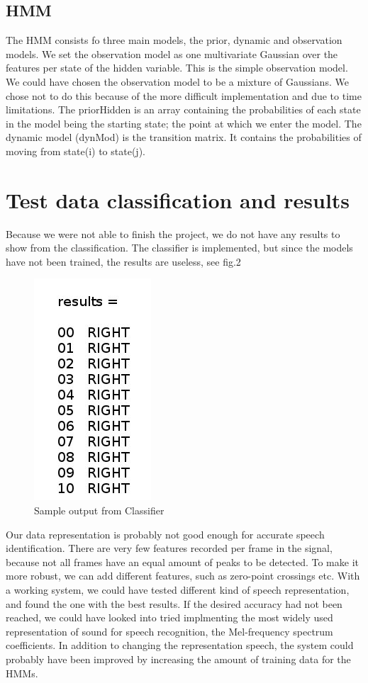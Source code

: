 \documentclass[titlepage]{article}
\begin{document}
    \subsection{HMM}
The HMM consists fo three main models, the prior, dynamic and observation models.  
We set the observation model as one multivariate Gaussian over the features per state of the hidden variable. This is the simple observation model. We could have chosen the observation model to be a mixture of Gaussians. We chose not to do this because of the more difficult implementation and due to time limitations. 
The priorHidden is an array containing the probabilities of each state in the model being the starting state; the point at which we enter the model.
The dynamic model (dynMod) is the transition matrix. It contains the probabilities of moving from state(i) to state(j).

\section{Test data classification and results}
        Because we were not able to finish the project, we do not have any results to show from the classification. The classifier is implemented, but since the models have not been trained, the results are useless, see fig.2
\begin{figure}[Frames plotted]
\center
     \includegraphics[scale = 0.5]{result}
    \caption{Sample output from Classifier}
\end{figure}
Our data representation is probably not good enough for accurate speech identification. There are very few features recorded per frame in the signal, because not all frames have an equal amount of peaks to be detected. To make it more robust, we can add different features, such as zero-point crossings etc. With a working system, we could have tested different kind of speech representation, and found the one with the best results. If the desired accuracy had not been reached, we could have looked into tried implmenting the most widely used representation of sound for speech recognition, the Mel-frequency spectrum coefficients. In addition to changing the representation speech, the system could probably have been improved by increasing the amount of training data for the HMMs.
\end{document}
